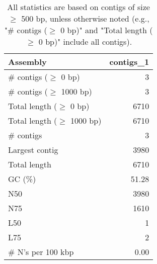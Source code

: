 \documentclass[12pt,a4paper]{article}
\begin{document}
\begin{table}[ht]
\begin{center}
\caption{All statistics are based on contigs of size $\geq$ 500 bp, unless otherwise noted (e.g., "\# contigs ($\geq$ 0 bp)" and "Total length ($\geq$ 0 bp)" include all contigs).}
\begin{tabular}{|l*{1}{|r}|}
\hline
Assembly & contigs\_1 \\ \hline
\# contigs ($\geq$ 0 bp) & 3 \\ \hline
\# contigs ($\geq$ 1000 bp) & 3 \\ \hline
Total length ($\geq$ 0 bp) & 6710 \\ \hline
Total length ($\geq$ 1000 bp) & 6710 \\ \hline
\# contigs & 3 \\ \hline
Largest contig & 3980 \\ \hline
Total length & 6710 \\ \hline
GC (\%) & 51.28 \\ \hline
N50 & 3980 \\ \hline
N75 & 1610 \\ \hline
L50 & 1 \\ \hline
L75 & 2 \\ \hline
\# N's per 100 kbp & 0.00 \\ \hline
\end{tabular}
\end{center}
\end{table}
\end{document}
